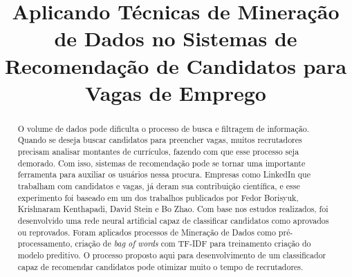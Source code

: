 \documentclass[conference]{IEEEtran}
\begin{document}
\title{Aplicando Técnicas de Mineração de Dados no Sistemas de Recomendação de Candidatos para Vagas de Emprego}

\author{
    \and
}
\maketitle

\begin{abstract}
    O volume de dados pode dificulta o processo de busca e filtragem de informação.  Quando se deseja buscar candidatos para preencher vagas, muitos recrutadores precisam analisar montantes de currículos, fazendo com que esse processo seja demorado. Com isso, sistemas de recomendação pode se tornar uma importante ferramenta para auxiliar os usuários nessa procura. Empresas como LinkedIn que trabalham com candidatos e vagas, já deram sua contribuição científica, e esse experimento foi baseado em um dos trabalhos publicados por Fedor Borisyuk, Krishnaram Kenthapadi, David Stein e Bo Zhao. Com base nos estudos realizados, foi desenvolvido uma rede neural artificial capaz de classificar candidatos como aprovados ou reprovados. Foram aplicados processos de Mineração de Dados como pré-processamento, criação de \textit{bag of words } com TF-IDF para treinamento criação do modelo preditivo. O processo proposto aqui para desenvolvimento de um classificador capaz de recomendar candidatos pode otimizar muito o tempo de recrutadores.
\end{abstract}
\end{document}
